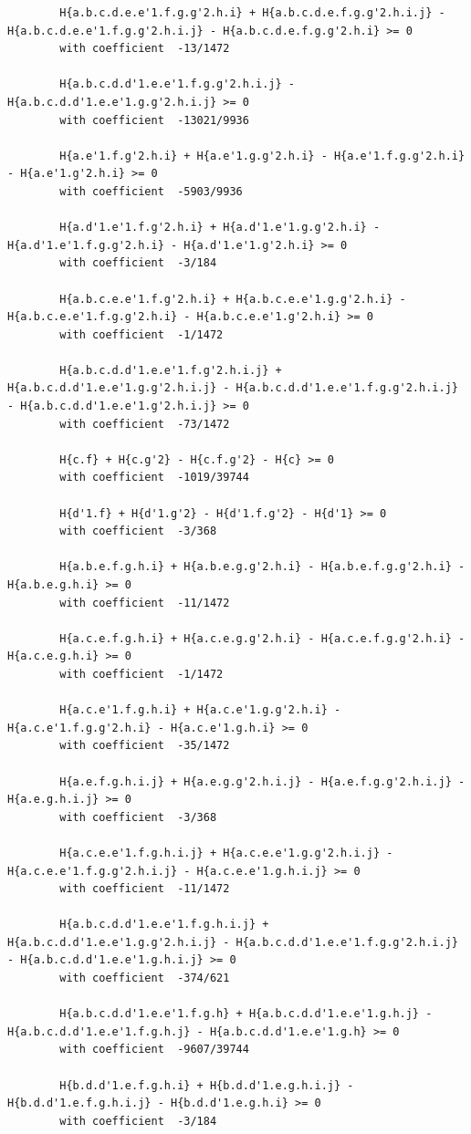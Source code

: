 \documentclass[11pt, a4paper]{kybernetika}
\begin{document}
\begin{verbatim}
		H{a.b.c.d.e.e'1.f.g.g'2.h.i} + H{a.b.c.d.e.f.g.g'2.h.i.j} - H{a.b.c.d.e.e'1.f.g.g'2.h.i.j} - H{a.b.c.d.e.f.g.g'2.h.i} >= 0
		with coefficient  -13/1472
		
		H{a.b.c.d.d'1.e.e'1.f.g.g'2.h.i.j} - H{a.b.c.d.d'1.e.e'1.g.g'2.h.i.j} >= 0
		with coefficient  -13021/9936
		
		H{a.e'1.f.g'2.h.i} + H{a.e'1.g.g'2.h.i} - H{a.e'1.f.g.g'2.h.i} - H{a.e'1.g'2.h.i} >= 0
		with coefficient  -5903/9936
		
		H{a.d'1.e'1.f.g'2.h.i} + H{a.d'1.e'1.g.g'2.h.i} - H{a.d'1.e'1.f.g.g'2.h.i} - H{a.d'1.e'1.g'2.h.i} >= 0
		with coefficient  -3/184
		
		H{a.b.c.e.e'1.f.g'2.h.i} + H{a.b.c.e.e'1.g.g'2.h.i} - H{a.b.c.e.e'1.f.g.g'2.h.i} - H{a.b.c.e.e'1.g'2.h.i} >= 0
		with coefficient  -1/1472
		
		H{a.b.c.d.d'1.e.e'1.f.g'2.h.i.j} + H{a.b.c.d.d'1.e.e'1.g.g'2.h.i.j} - H{a.b.c.d.d'1.e.e'1.f.g.g'2.h.i.j} - H{a.b.c.d.d'1.e.e'1.g'2.h.i.j} >= 0
		with coefficient  -73/1472
		
		H{c.f} + H{c.g'2} - H{c.f.g'2} - H{c} >= 0
		with coefficient  -1019/39744
		
		H{d'1.f} + H{d'1.g'2} - H{d'1.f.g'2} - H{d'1} >= 0
		with coefficient  -3/368
		
		H{a.b.e.f.g.h.i} + H{a.b.e.g.g'2.h.i} - H{a.b.e.f.g.g'2.h.i} - H{a.b.e.g.h.i} >= 0
		with coefficient  -11/1472
		
		H{a.c.e.f.g.h.i} + H{a.c.e.g.g'2.h.i} - H{a.c.e.f.g.g'2.h.i} - H{a.c.e.g.h.i} >= 0
		with coefficient  -1/1472
		
		H{a.c.e'1.f.g.h.i} + H{a.c.e'1.g.g'2.h.i} - H{a.c.e'1.f.g.g'2.h.i} - H{a.c.e'1.g.h.i} >= 0
		with coefficient  -35/1472
		
		H{a.e.f.g.h.i.j} + H{a.e.g.g'2.h.i.j} - H{a.e.f.g.g'2.h.i.j} - H{a.e.g.h.i.j} >= 0
		with coefficient  -3/368
		
		H{a.c.e.e'1.f.g.h.i.j} + H{a.c.e.e'1.g.g'2.h.i.j} - H{a.c.e.e'1.f.g.g'2.h.i.j} - H{a.c.e.e'1.g.h.i.j} >= 0
		with coefficient  -11/1472
		
		H{a.b.c.d.d'1.e.e'1.f.g.h.i.j} + H{a.b.c.d.d'1.e.e'1.g.g'2.h.i.j} - H{a.b.c.d.d'1.e.e'1.f.g.g'2.h.i.j} - H{a.b.c.d.d'1.e.e'1.g.h.i.j} >= 0
		with coefficient  -374/621
		
		H{a.b.c.d.d'1.e.e'1.f.g.h} + H{a.b.c.d.d'1.e.e'1.g.h.j} - H{a.b.c.d.d'1.e.e'1.f.g.h.j} - H{a.b.c.d.d'1.e.e'1.g.h} >= 0
		with coefficient  -9607/39744
		
		H{b.d.d'1.e.f.g.h.i} + H{b.d.d'1.e.g.h.i.j} - H{b.d.d'1.e.f.g.h.i.j} - H{b.d.d'1.e.g.h.i} >= 0
		with coefficient  -3/184
		

\end{verbatim}
\end{document}
